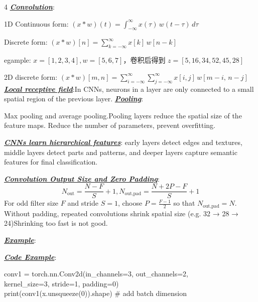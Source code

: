 \documentclass[12pt]{article}
\newcommand{\bulletPoint}[1]{\underline{\textit{\textbf{#1}}}}
\begin{document}
\begin{multicols*}{4}
\bulletPoint{Convolution}:

1D Continuous form: $\displaystyle(x * w)(t) = \int_{-\infty}^{\infty} x(\tau)\, w(t-\tau)\, d\tau$

Discrete form: $\displaystyle(x * w)[n] = \sum_{k=-\infty}^{\infty} x[k]\, w[n-k]$

egample: $x=[1,2,3,4], w=[5,6,7]$，卷积后得到 $z=[5,16,34,52,45,28]$

2D discrete form: $(x * w)[m,n] = \sum_{i=-\infty}^{\infty} \sum_{j=-\infty}^{\infty} x[i,j]\, w[m-i,\, n-j]$
\bulletPoint{Local receptive field}:In CNNs, neurons in a layer are only connected to a small spatial region
of the previous layer.
\bulletPoint{Pooling}:

Max pooling and average pooling.Pooling layers reduce the spatial size of the feature maps. Reduce the number of parameters, prevent overfitting.


\bulletPoint{CNNs learn hierarchical features}: early layers detect edges and textures, middle layers detect parts and patterns, and deeper layers capture semantic features for final classification.

\bulletPoint{Convolution Output Size and Zero Padding}:
\useshortskip
\begin{equation*}
N_{\text{out}} = \frac{N-F}{S}+1, 
N_{\text{out,pad}} = \frac{N+2P-F}{S}+1
\end{equation*}
For odd filter size $F$ and stride $S=1$, choose
$P=\frac{F-1}{2}$ so that $N_{\text{out,pad}}=N$.
Without padding, repeated convolutions shrink spatial size (e.g. 32 → 28 → 24)Shrinking too fast is not good.

\bulletPoint{Example}:
\useshortskip\noindent{}

\bulletPoint{Code Example}:
\useshortskip
\noindent\begin{minipage}{\linewidth}
{\color{blue}\ttfamily
conv1 = torch.nn.Conv2d(in\_channels=3, out\_channels=2,\\
kernel\_size=3, stride=1, padding=0)\\
print(conv1(x.unsqueeze(0)).shape) \# add batch dimension
}
\end{minipage}


\end{multicols*}
\end{document}
